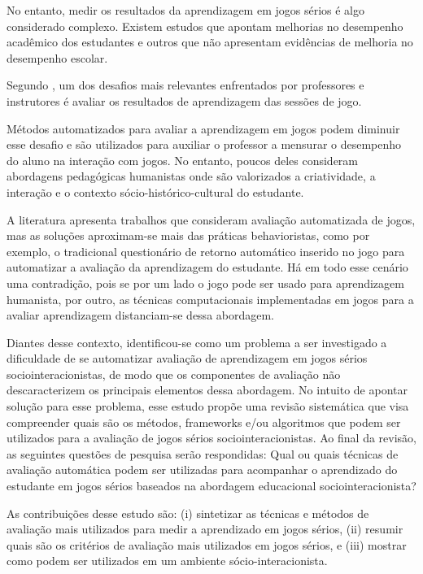 \documentclass[12pt]{article}
\begin{document}
No entanto, medir os resultados da aprendizagem em jogos sérios é algo considerado complexo. Existem estudos que apontam melhorias no desempenho acadêmico dos estudantes e outros que não apresentam evidências de melhoria no desempenho escolar.

Segundo \cite{del2010easing}, um dos desafios mais relevantes enfrentados por professores e instrutores é avaliar os resultados de aprendizagem das sessões de jogo. 

Métodos automatizados para avaliar a aprendizagem em jogos podem diminuir esse desafio e são utilizados para auxiliar o professor a mensurar o desempenho do aluno na interação com jogos. No entanto, poucos deles consideram abordagens pedagógicas humanistas onde são valorizados a criatividade, a interação e o contexto sócio-histórico-cultural do estudante. 

A literatura apresenta trabalhos que consideram avaliação automatizada de jogos, mas as soluções aproximam-se mais das práticas behavioristas, como por exemplo, o tradicional questionário de retorno automático inserido no jogo para automatizar a avaliação da aprendizagem do estudante. 
Há em todo esse cenário uma contradição, pois se por um lado o jogo pode ser usado para aprendizagem humanista, por outro, as técnicas computacionais implementadas em jogos para a avaliar aprendizagem distanciam-se dessa abordagem. 

Diantes desse contexto, identificou-se como um problema a ser investigado a dificuldade de se automatizar avaliação de aprendizagem em jogos sérios sociointeracionistas, de modo que os componentes de avaliação não descaracterizem os principais elementos dessa abordagem. No intuito de apontar solução para esse problema, esse estudo propõe uma revisão sistemática que visa compreender quais são os métodos, frameworks e/ou algoritmos que podem ser utilizados para a avaliação de jogos sérios sociointeracionistas. Ao final da revisão, as seguintes questões de pesquisa serão respondidas: Qual ou quais técnicas de avaliação automática podem ser utilizadas para acompanhar o aprendizado do estudante em jogos sérios baseados na abordagem educacional sociointeracionista?

As contribuições desse estudo são: (i) sintetizar as técnicas e métodos de avaliação mais utilizados para medir a aprendizado em jogos sérios, (ii) resumir quais são os critérios de avaliação mais utilizados em jogos sérios, e (iii) mostrar como podem ser utilizados em um ambiente sócio-interacionista.
\end{document}
